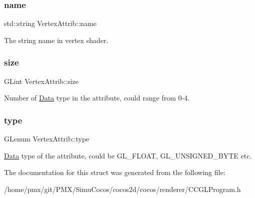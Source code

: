 \subsubsection{\texorpdfstring{name}{name}}
{\footnotesize\ttfamily std\+::string Vertex\+Attrib\+::name}

The string name in vertex shader. \mbox{\label{structVertexAttrib_af3234dae1a8d73dba4659245a3ea26a1}} 
\subsubsection{\texorpdfstring{size}{size}}
{\footnotesize\ttfamily G\+Lint Vertex\+Attrib\+::size}

Number of \hyperlink{classData}{Data} type in the attribute, could range from 0-\/4. \mbox{\label{structVertexAttrib_a3b680eabd2a7ceccf1647774c19ca689}} 
\subsubsection{\texorpdfstring{type}{type}}
{\footnotesize\ttfamily G\+Lenum Vertex\+Attrib\+::type}

\hyperlink{classData}{Data} type of the attribute, could be G\+L\+\_\+\+F\+L\+O\+AT, G\+L\+\_\+\+U\+N\+S\+I\+G\+N\+E\+D\+\_\+\+B\+Y\+TE etc. 

The documentation for this struct was generated from the following file\+:\begin{DoxyCompactItemize}
\item 
/home/pmx/git/\+P\+M\+X/\+Simu\+Cocos/cocos2d/cocos/renderer/C\+C\+G\+L\+Program.\+h\end{DoxyCompactItemize}
